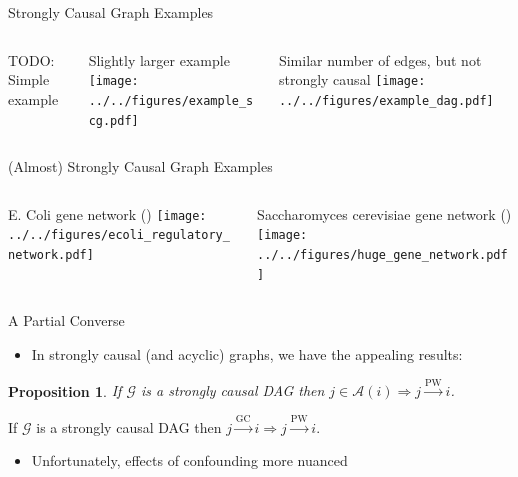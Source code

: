 \documentclass{beamer} %
\newtheorem*{proposition}{Proposition}
\def\gc{\overset{\text{GC}}{\rightarrow}}  %
\def\pwgc{\overset{\text{PW}}{\rightarrow}}  %
\def\gcg{\mathcal{G}}  %
\newcommand{\anc}[1]{\mathcal{A}(#1)}  %
\begin{document}
\begin{frame}{Strongly Causal Graph Examples}
  \begin{columns}
    \begin{column}{0.33\linewidth}
      TODO: Simple example\pause
    \end{column}
    \begin{column}{0.33\linewidth}
      \small{Slightly larger example}
      \texttt{[image: ../../figures/example\_scg.pdf]}\pause
    \end{column}
    \begin{column}{0.33\linewidth}
      \small{Similar number of edges, but not strongly causal}
      \texttt{[image: ../../figures/example\_dag.pdf]}
    \end{column}
  \end{columns}
\end{frame}

\begin{frame}{(Almost) Strongly Causal Graph Examples}
  \begin{columns}
    \begin{column}{0.5\linewidth}
      \small{E. Coli gene network \tiny{()}}
      \texttt{[image: ../../figures/ecoli\_regulatory\_network.pdf]}\pause
    \end{column}
    \begin{column}{0.5\linewidth}
      \small{Saccharomyces cerevisiae gene network \tiny{()}}
      \texttt{[image: ../../figures/huge\_gene\_network.pdf]}\pause
    \end{column}
  \end{columns}
\end{frame}

\begin{frame}{A Partial Converse}
  \begin{itemize}
    \item{In strongly causal (and acyclic) graphs, we have the appealing results:}
  \end{itemize}

  \begin{proposition}
    \label{prop:pwgc_anc}
    If $\gcg$ is a strongly causal DAG then $j \in \anc{i} \Rightarrow j \pwgc i$.
  \end{proposition}\pause

  \begin{corollary}
    \label{cor:gc_implies_pwgc}
    If $\gcg$ is a strongly causal DAG then $j \gc i \Rightarrow j \pwgc i$.
  \end{corollary}\pause

  \begin{itemize}
    \item{Unfortunately, effects of confounding more nuanced}\pause
  \end{itemize}
\end{frame}
\end{document}
